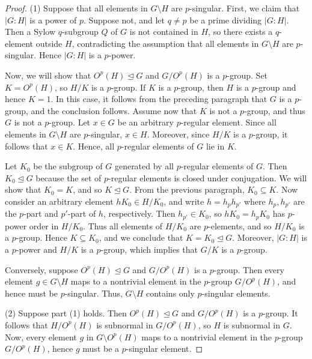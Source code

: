 \documentclass[twoside,a4paper,reqno,11pt]{amsart}
\newcommand{\<}{\langle}
\renewcommand{\>}{\rangle}
\renewcommand{\:}{\colon}
\theoremstyle{definition}
\begin{document}
\begin{proof} (1) Suppose that all elements in $G \setminus H$ are $p$-singular. First, we claim that  $|G:H|$ is a power of $p$. Suppose not, and let $q\neq p$ be a prime dividing $|G:H|$. Then a Sylow  $q$-subgroup $Q$ of $G$ is not contained in  $H$, so there exists a $q$-element outside $H$, contradicting the assumption that all elements in $G\setminus H$ are $p$-singular. Hence $|G:H|$ is a $p$-power. 
	
Now, we will show that $O^p(H) \unlhd G$ and $G/O^p(H)$ is a $p$-group.  Set $K = O^p(H)$, so $H/K$ is a $p$-group. If $K$ is a $p$-group, then $H$ is a $p$-group and hence $K=1$. In this case, it follows from the preceding paragraph that  $G$ is a  $p$-group, and the conclusion follows. Assume now that $K$ is not a $p$-group, and thus $G$ is not a $p$-group. Let $x\in G$ be an arbitrary $p$-regular element.  Since all elements in $G\setminus H$ are $p$-singular, $x \in H$. Moreover, since $H/K$ is a $p$-group, it follows that $x\in K$. Hence, all $p$-regular elements of $G$ lie in $K$. 
	
Let $K_0$ be the subgroup of $G$ generated by all $p$-regular elements of $G$. Then $K_0\unlhd G$ because the set of $p$-regular elements is closed under conjugation. We will show that $K_0 = K$, and so $K\unlhd G$.  From the previous paragraph, $K_0\subseteq K$. Now consider an arbitrary element $hK_0 \in H/K_0$, and write   $h=h_ph_{p'}$ where $h_p,h_{p'} $ are the $p$-part and $p'$-part of $h$, respectively. Then $h_{p'}\in K_0$, so $hK_0 = h_pK_0$ has  $p$-power order in $H/K_0$.  Thus all elements of $H/K_0$ are $p$-elements, and so $H/K_0$ is a $p$-group. Hence  $K\subseteq K_0$, and we conclude that $K= K_0\unlhd G$. Moreover, $|G:H|$ is a $p$-power and $H/K$ is a $p$-group, which implies that $G/K$ is a $p$-group. 
	

	
Conversely,  suppose $O^p(H)\unlhd G$ and $G/O^p(H)$ is a $p$-group. Then every element $g\in G\setminus H$ maps to a nontrivial element in the $p$-group $G/O^p(H)$, and hence must be $p$-singular. Thus, $G\setminus H$ contains only $p$-singular elements. 
	
	
(2)  Suppose part (1) holds. Then $O^p(H) \unlhd G$ and  $G/O^p(H)$ is a $p$-group. It follows that $H/O^p(H)$ is subnormal in $G/O^p(H)$, so $H$ is subnormal in $G$. Now, every element $g$ in $G\setminus O^p(H)$ maps to a nontrivial element in the $p$-group $G/O^p(H)$, hence $g$ must be a $p$-singular element. 
\end{proof}
\end{document}
